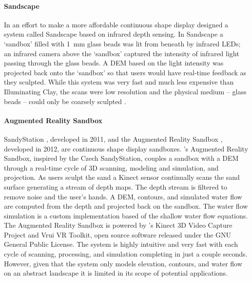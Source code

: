 \documentclass{article}
\begin{document}
\paragraph{Sandscape}
In an effort to make a more affordable continuous shape display \citet{Ishii2004} designed a system called Sandscape based on infrared depth sensing. In Sandscape a `sandbox' filled with 1~mm glass beads was lit from beneath by infrared LEDs; an infrared camera above the `sandbox' captured the intensity of infrared light passing through the glass beads. A DEM based on the light intensity was projected back onto the `sandbox' so that users would have real-time feedback as they sculpted. While this system was very fast and much less expensive than Illuminating Clay, the scans were low resolution and the physical medium -- glass beads -- could only be coarsely sculpted \citep{Ishii2004, Ishii2008b}.  


\paragraph{Augmented Reality Sandbox} %
SandyStation \citep{Altman2014}, developed in 2011, and the Augmented Reality Sandbox \citep{Kreylos2015}, developed in 2012, are continuous shape display sandboxes. \citeauthor{Kreylos2015}'s Augmented Reality Sandbox, inspired by the Czech SandyStation,
couples a sandbox with a DEM
through a real-time cycle of 3D scanning, modeling and simulation, and projection.
As users sculpt the sand a Kinect sensor continually scans the sand surface generating
a stream of depth maps.
The depth stream is filtered to remove noise and the user's hands.
A DEM, contours, and simulated water flow are computed from the depth
and projected back on the sandbox.
The water flow simulation is a custom implementation based of the shallow water flow equations.
The Augmented Reality Sandbox is
powered by \citeauthor{Kreylos2015}'s Kinect 3D Video Capture Project
and Vrui VR Toolkit, open source software released under the GNU General Public License.
The system is highly intuitive and very fast with each cycle of scanning, processing,
and simulation completing in just a couple seconds.
However, given that the system only models elevation, contours, and water flow
on an abstract landscape it is limited in its scope of potential applications.
\end{document}
